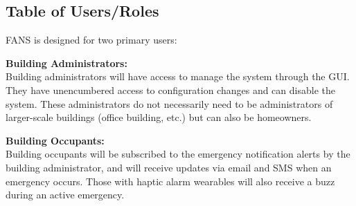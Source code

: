 \subsection{Table of Users/Roles}

FANS is designed for two primary users:

\textbf{Building Administrators:} \\
Building administrators will have access to manage the system through the GUI. They have unencumbered access to
configuration changes and can disable the system. These administrators do not necessarily need to be administrators of
larger-scale buildings (office building, etc.) but can also be homeowners.

\textbf{Building Occupants:} \\
Building occupants will be subscribed to the emergency notification alerts by the building administrator, and will
receive updates via email and SMS when an emergency occurs. Those with haptic alarm wearables will also receive a buzz
during an active emergency.
